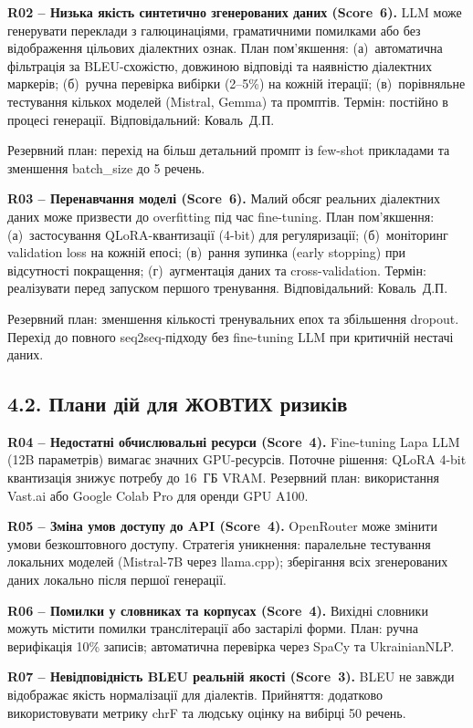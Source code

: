\documentclass[14pt]{extarticle}
\begin{document}
\textbf{R02 -- Низька якість синтетично згенерованих даних (Score~6).}
LLM може генерувати переклади з галюцинаціями, граматичними помилками або без відображення цільових діалектних ознак. План пом'якшення: (а)~автоматична фільтрація за BLEU-схожістю, довжиною відповіді та наявністю діалектних маркерів; (б)~ручна перевірка вибірки (2--5\%) на кожній ітерації; (в)~порівняльне тестування кількох моделей (Mistral, Gemma) та промптів. Термін: постійно в процесі генерації. Відповідальний: Коваль~Д.П.

Резервний план: перехід на більш детальний промпт із few-shot прикладами та зменшення batch\_size до 5 речень.

\textbf{R03 -- Перенавчання моделі (Score~6).}
Малий обсяг реальних діалектних даних може призвести до overfitting під час fine-tuning. План пом'якшення: (а)~застосування QLoRA-квантизації (4-bit) для регуляризації; (б)~моніторинг validation loss на кожній епосі; (в)~рання зупинка (early stopping) при відсутності покращення; (г)~аугментація даних та cross-validation. Термін: реалізувати перед запуском першого тренування. Відповідальний: Коваль~Д.П.

Резервний план: зменшення кількості тренувальних епох та збільшення dropout. Перехід до повного seq2seq-підходу без fine-tuning LLM при критичній нестачі даних.

\subsection*{4.2. Плани дій для ЖОВТИХ ризиків}

\textbf{R04 -- Недостатні обчислювальні ресурси (Score~4).}
Fine-tuning Lapa LLM (12B параметрів) вимагає значних GPU-ресурсів. Поточне рішення: QLoRA 4-bit квантизація знижує потребу до 16~ГБ VRAM. Резервний план: використання Vast.ai або Google Colab Pro для оренди GPU A100.

\textbf{R05 -- Зміна умов доступу до API (Score~4).}
OpenRouter може змінити умови безкоштовного доступу. Стратегія уникнення: паралельне тестування локальних моделей (Mistral-7B через llama.cpp); зберігання всіх згенерованих даних локально після першої генерації.

\textbf{R06 -- Помилки у словниках та корпусах (Score~4).}
Вихідні словники можуть містити помилки транслітерації або застарілі форми. План: ручна верифікація 10\% записів; автоматична перевірка через SpaCy та UkrainianNLP.

\textbf{R07 -- Невідповідність BLEU реальній якості (Score~3).}
BLEU не завжди відображає якість нормалізації для діалектів. Прийняття: додатково використовувати метрику chrF та людську оцінку на вибірці 50 речень.
\end{document}
